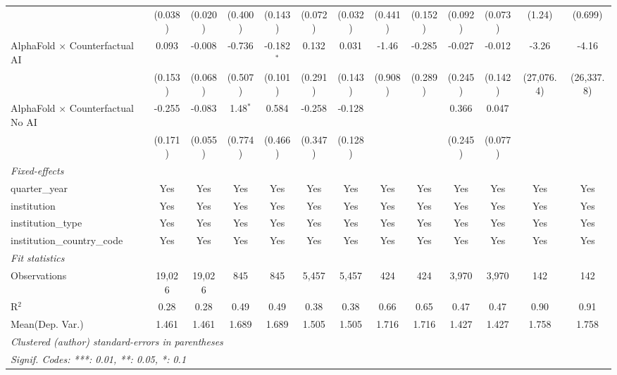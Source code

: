 \begin{tabular}{lcccccccccccc}
                                            & (0.038)       & (0.020)       & (0.400)    & (0.143)      & (0.072)      & (0.032)       & (0.441) & (0.152) & (0.092) & (0.073) & (1.24)       & (0.699)\\   
   AlphaFold $\times$ Counterfactual AI     & 0.093         & -0.008        & -0.736     & -0.182$^{*}$ & 0.132        & 0.031         & -1.46   & -0.285  & -0.027  & -0.012  & -3.26        & -4.16\\   
                                            & (0.153)       & (0.068)       & (0.507)    & (0.101)      & (0.291)      & (0.143)       & (0.908) & (0.289) & (0.245) & (0.142) & (27,076.4)   & (26,337.8)\\   
   AlphaFold $\times$ Counterfactual No AI  & -0.255        & -0.083        & 1.48$^{*}$ & 0.584        & -0.258       & -0.128        &         &         & 0.366   & 0.047   &              &   \\   
                                            & (0.171)       & (0.055)       & (0.774)    & (0.466)      & (0.347)      & (0.128)       &         &         & (0.245) & (0.077) &              &   \\   
   \midrule
   \emph{Fixed-effects}\\
   quarter\_year                            & Yes           & Yes           & Yes        & Yes          & Yes          & Yes           & Yes     & Yes     & Yes     & Yes     & Yes          & Yes\\  
   institution                              & Yes           & Yes           & Yes        & Yes          & Yes          & Yes           & Yes     & Yes     & Yes     & Yes     & Yes          & Yes\\  
   institution\_type                        & Yes           & Yes           & Yes        & Yes          & Yes          & Yes           & Yes     & Yes     & Yes     & Yes     & Yes          & Yes\\  
   institution\_country\_code               & Yes           & Yes           & Yes        & Yes          & Yes          & Yes           & Yes     & Yes     & Yes     & Yes     & Yes          & Yes\\  
   \midrule
   \emph{Fit statistics}\\
   Observations                             & 19,026        & 19,026        & 845        & 845          & 5,457        & 5,457         & 424     & 424     & 3,970   & 3,970   & 142          & 142\\  
   R$^2$                                    & 0.28          & 0.28          & 0.49       & 0.49         & 0.38         & 0.38          & 0.66    & 0.65    & 0.47    & 0.47    & 0.90         & 0.91\\  
Mean(Dep. Var.) & 1.461 & 1.461 & 1.689 & 1.689 & 1.505 & 1.505 & 1.716 & 1.716 & 1.427 & 1.427 & 1.758 & 1.758 \\
   \midrule \midrule
   \multicolumn{13}{l}{\emph{Clustered (author) standard-errors in parentheses}}\\
   \multicolumn{13}{l}{\emph{Signif. Codes: ***: 0.01, **: 0.05, *: 0.1}}\\
\end{tabular}
\par\endgroup
